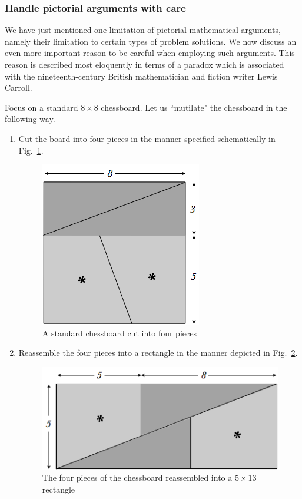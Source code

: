 \subsubsection{Handle pictorial arguments with care}

We have just mentioned one limitation of pictorial mathematical arguments, namely their limitation to certain types of problem solutions.  We now discuss an even more important reason to be careful when employing such arguments.  This reason is described most eloquently in terms of a paradox which is associated with the nineteenth-century British mathematician and fiction writer Lewis Carroll.

\medskip

Focus on a standard $8 \times 8$ chessboard.  Let us ``mutilate" the chessboard in the following way.
\begin{enumerate}
\item
Cut the board into four pieces in the manner specified schematically in Fig.~\ref{fig:LewisCarollParadox1}.
\begin{figure}[ht]
\begin{center}
       \includegraphics[scale=0.475]{FiguresMaths/LewisCarollParadox1}
\caption{A standard chessboard cut into four pieces}
       \label{fig:LewisCarollParadox1}
\end{center}
\end{figure}
\medskip\item
Reassemble the four pieces into a rectangle in the manner depicted in Fig.~\ref{fig:LewisCarollParadox2}. 
\begin{figure}[ht]
\begin{center}
       \includegraphics[scale=0.475]{FiguresMaths/LewisCarollParadox2}
\caption{The four pieces of the chessboard reassembled into a $5 \times13$ rectangle}
       \label{fig:LewisCarollParadox2}
\end{center}
\end{figure}
\end{enumerate}

